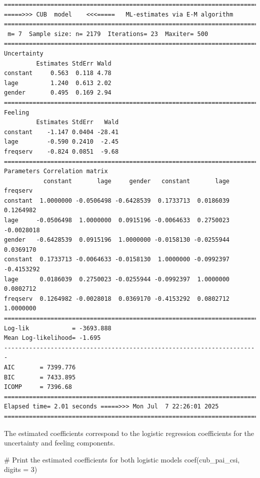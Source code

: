 \documentclass[
  letterpaper,
  DIV=11,
  numbers=noendperiod]{scrartcl}
\newenvironment{Shaded}{\begin{snugshade}}{\end{snugshade}}
\newcommand{\AttributeTok}[1]{\textcolor[rgb]{0.40,0.45,0.13}{#1}}
\newcommand{\CommentTok}[1]{\textcolor[rgb]{0.37,0.37,0.37}{#1}}
\newcommand{\DecValTok}[1]{\textcolor[rgb]{0.68,0.00,0.00}{#1}}
\newcommand{\FunctionTok}[1]{\textcolor[rgb]{0.28,0.35,0.67}{#1}}
\newcommand{\NormalTok}[1]{\textcolor[rgb]{0.00,0.23,0.31}{#1}}
\begin{document}
\begin{verbatim}
======================================================================= 
=====>>> CUB  model    <<<=====   ML-estimates via E-M algorithm   
======================================================================= 
 m= 7  Sample size: n= 2179  Iterations= 23  Maxiter= 500 
======================================================================= 
Uncertainty                                            
         Estimates StdErr Wald
constant     0.563  0.118 4.78
lage         1.240  0.613 2.02
gender       0.495  0.169 2.94
======================================================================= 
Feeling                                            
         Estimates StdErr   Wald
constant    -1.147 0.0404 -28.41
lage        -0.590 0.2410  -2.45
freqserv    -0.824 0.0851  -9.68
======================================================================= 
Parameters Correlation matrix 
           constant       lage     gender   constant       lage   freqserv
constant  1.0000000 -0.0506498 -0.6428539  0.1733713  0.0186039  0.1264982
lage     -0.0506498  1.0000000  0.0915196 -0.0064633  0.2750023 -0.0028018
gender   -0.6428539  0.0915196  1.0000000 -0.0158130 -0.0255944  0.0369170
constant  0.1733713 -0.0064633 -0.0158130  1.0000000 -0.0992397 -0.4153292
lage      0.0186039  0.2750023 -0.0255944 -0.0992397  1.0000000  0.0802712
freqserv  0.1264982 -0.0028018  0.0369170 -0.4153292  0.0802712  1.0000000
======================================================================= 
Log-lik            = -3693.888 
Mean Log-likelihood= -1.695 
----------------------------------------------------------------------- 
AIC       = 7399.776 
BIC       = 7433.895 
ICOMP     = 7396.68 
======================================================================= 
Elapsed time= 2.01 seconds =====>>> Mon Jul  7 22:26:01 2025 
======================================================================= 
\end{verbatim}

The estimated coefficients correspond to the logistic regression
coefficients for the uncertainty and feeling components.

\begin{Shaded}
\begin{Highlighting}[]
\CommentTok{\# Print the estimated coefficients for both logistic models}
\FunctionTok{coef}\NormalTok{(cub\_pai\_csi, }\AttributeTok{digits =} \DecValTok{3}\NormalTok{)}
\end{Highlighting}
\end{Shaded}
\end{document}
